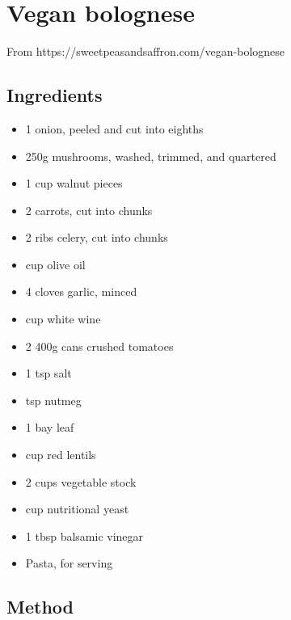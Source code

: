 \clearpage
\section{Vegan bolognese}



From https://sweetpeasandsaffron.com/vegan-bolognese

\subsection{Ingredients}

\begin{itemize}
	\item 1 onion, peeled and cut into eighths
    \item 250g mushrooms, washed, trimmed, and quartered
    \item 1 cup walnut pieces
    \item 2 carrots, cut into chunks
    \item 2 ribs celery, cut into chunks
    \item {} cup olive oil
    \item 4 cloves garlic, minced
    \item {} cup white wine
    \item 2 400g cans crushed tomatoes
    \item 1 tsp salt
    \item {} tsp nutmeg
    \item 1 bay leaf
    \item {} cup red lentils
    \item 2 cups vegetable stock
    \item {} cup nutritional yeast
    \item 1 tbsp balsamic vinegar
    \item Pasta, for serving
\end{itemize}

\subsection{Method}

